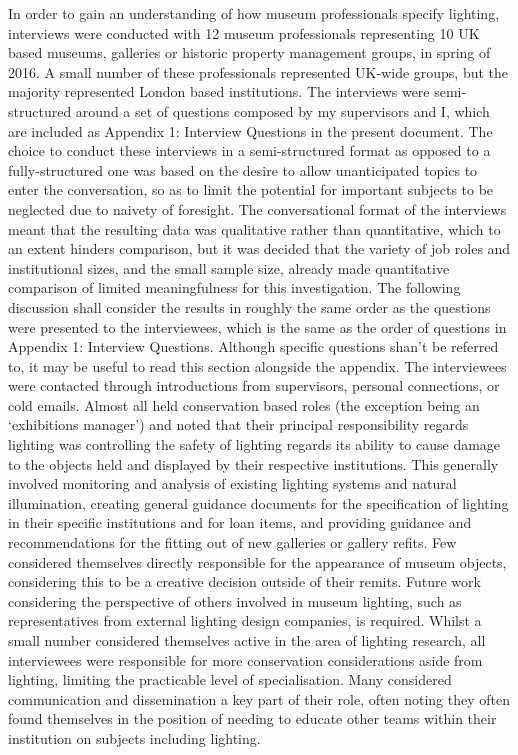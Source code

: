 In order to gain an understanding of how museum professionals specify lighting, interviews were conducted with 12 museum professionals representing 10 UK based museums, galleries or historic property management groups, in spring of 2016. A small number of these professionals represented UK-wide groups, but the majority represented London based institutions.
The interviews were semi-structured around a set of questions composed by my supervisors and I, which are included as Appendix 1: Interview Questions in the present document. The choice to conduct these interviews in a semi-structured format as opposed to a fully-structured one was based on the desire to allow unanticipated topics to enter the conversation, so as to limit the potential for important subjects to be neglected due to naivety of foresight. The conversational format of the interviews meant that the resulting data was qualitative rather than quantitative, which to an extent hinders comparison, but it was decided that the variety of job roles and institutional sizes, and the small sample size, already made quantitative comparison of limited meaningfulness for this investigation.
The following discussion shall consider the results in roughly the same order as the questions were presented to the interviewees, which is the same as the order of questions in Appendix 1: Interview Questions. Although specific questions shan't be referred to, it may be useful to read this section alongside the appendix.
The interviewees were contacted through introductions from supervisors, personal connections, or cold emails. Almost all held conservation based roles (the exception being an `exhibitions manager') and noted that their principal responsibility regards lighting was controlling the safety of lighting regards its ability to cause damage to the objects held and displayed by their respective institutions. This generally involved monitoring and analysis of existing lighting systems and natural illumination, creating general guidance documents for the specification of lighting in their specific institutions and for loan items, and providing guidance and recommendations for the fitting out of new galleries or gallery refits. Few considered themselves directly responsible for the appearance of museum objects, considering this to be a creative decision outside of their remits. Future work considering the perspective of others involved in museum lighting, such as representatives from external lighting design companies, is required.
Whilst a small number considered themselves active in the area of lighting research, all interviewees were responsible for more conservation considerations aside from lighting, limiting the practicable level of specialisation. Many considered communication and dissemination a key part of their role, often noting they often found themselves in the position of needing to educate other teams within their institution on subjects including lighting. 
